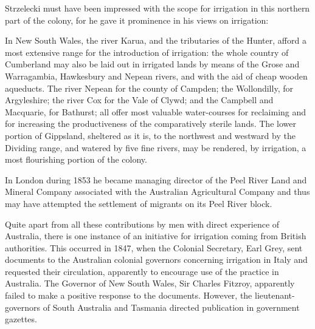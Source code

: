 Strzelecki must have been impressed with the scope for irrigation in
this northern part of the colony, for he gave it prominence in his
views on irrigation:
\begin{Quote}
	In New South Wales, the river Karua,  and
	the tributaries of the Hunter,  afford a
	most extensive range for the introduction of irrigation: the
	whole country of Cumberland may also be laid out in irrigated
	lands by means of the Grose  and
	Warragambia,  Hawkesbury
	 and Nepean 
	rivers, and with the aid of cheap wooden
	aqueducts.  The river
	Nepean for the county of Campden; the Wollondilly,
	 for Argyleshire; the river Cox
	 for the Vale of Clywd; and the Campbell
	 and Macquarie, 
	for Bathurst; all offer most valuable water-courses for
	reclaiming and for increasing the productiveness of the
	comparatively sterile lands. The lower portion of Gippsland,
	 sheltered as it is, to the northwest
	and westward by the Dividing range, and watered by five fine
	rivers, may be rendered, by irrigation, a most flourishing
	portion of the colony.
\end{Quote}

In London during 1853 he became managing director of the Peel River
Land and Mineral Company associated with the Australian Agricultural
Company and thus may have attempted the settlement of migrants on its
Peel River 
block.

Quite apart from all these contributions by men with direct experience
of Australia, there is one instance of an initiative for irrigation
coming from British authorities.  This occurred in 1847, when the
Colonial Secretary, Earl Grey,  sent documents to
the Australian colonial governors concerning irrigation in
Italy and requested their circulation, apparently to
encourage use of the practice in Australia.  The Governor of New South
Wales, Sir Charles Fitzroy,  apparently failed
to make a positive response to the documents.  However, the
lieutenant-governors of South Australia and Tasmania directed
publication in government gazettes.

